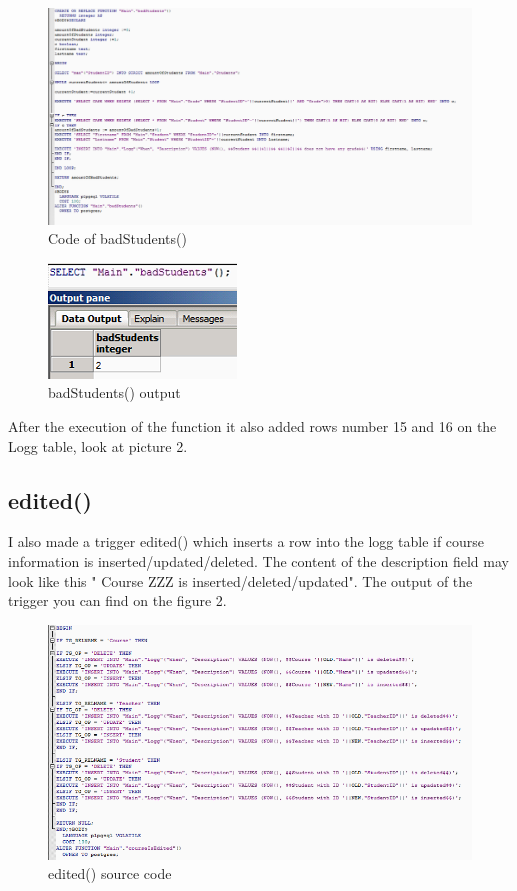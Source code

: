 \documentclass[english]{article}
\begin{document}
\begin{figure}[h]
\centerline{\includegraphics[scale=0.6]{PLPGSQL/badStudentScript}}
\caption{Code of badStudents()}
\end{figure}

\begin{figure}[h]
\centerline{\includegraphics{PLPGSQL/badStudentOutPut}}
\caption{badStudents() output}
\end{figure}

After the execution of the function it also added rows number 15 and 16 on the Logg table, look at picture 2.
\subsection{edited()}
I also made a trigger edited() which inserts a row into the logg table if course information is inserted/updated/deleted.  The content of the description field may look like this " Course ZZZ is inserted/deleted/updated". The output of the trigger you can find on the figure 2.
\begin{figure}[h]
\centerline{\includegraphics[scale=0.8]{PLPGSQL/editSource}}
\caption{edited() source code}
\end{figure}
\end{document}

